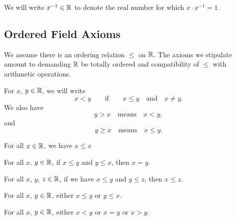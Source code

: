 \begin{remark}
We will write $x^{-1}\in\mathbb{R}$ to denote the real number for which $x\cdot x^{-1}=1$.
\end{remark}

\subsection{Ordered Field Axioms}

\M
We assume there is an ordering relation $\leq$ on $\mathbb{R}$. The axioms we
stipulate amount to demanding $\mathbb{R}$ be totally ordered and compatibility
of $\leq$ with arithmetic operations.

For $x$, $y\in\mathbb{R}$, we will write
\begin{equation}
x < y\qquad\mbox{if}\qquad x\leq y\quad\mbox{and}\quad x\neq y.
\end{equation}
We also have
\begin{equation}
y > x\quad\mbox{means}\quad x < y,
\end{equation}
and
\begin{equation}
y\geq x\quad\mbox{means}\quad x\leq y.
\end{equation}

\begin{axiom}\label{axiom:elementary-algebra:order-reflexivity}
For all $x\in\mathbb{R}$, we have $x\leq x$
\end{axiom}

\begin{axiom}\label{axiom:elementary-algebra:order-antisymmetry}
For all $x$, $y\in\mathbb{R}$, if $x\leq y$ and $y\leq x$, then $x=y$.
\end{axiom}

\begin{axiom}\label{axiom:elementary-algebra:order-transitivity}
For all $x$, $y$, $z\in\mathbb{R}$, if we have $x\leq y$ and $y\leq z$,
then $x\leq z$.
\end{axiom}

\begin{axiom}\label{axiom:elementary-algebra:order-total}
For all $x$, $y\in\mathbb{R}$, either $x\leq y$ or $y\leq x$.
\end{axiom}

\begin{proposition}\label{prop:elementary-algebra:order-total}
For all $x$, $y\in\mathbb{R}$, either $x < y$ or $x = y$ or $x > y$.
\end{proposition}

